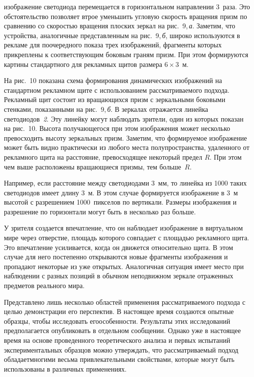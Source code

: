 \begin{multicols}{2}
\bigskip
\addtocounter{figure}{1}  

\noindent
изображение светодиода перемещается в горизонтальном направлении 3~раза. Это 
обстоятельство позволяет втрое уменьшить угловую скорость вращения призм по 
сравнению со скоростью вращения плоских зеркал на рис.~9,\,\textit{а}. Заметим, 
что устройства, аналогичные представленным на рис.~9,\,\textit{б}, широко 
используются в рекламе для поочередного показа трех изображений, фрагменты которых 
прикреплены к соответствующим боковым граням призм. При этом формируются 
картины стандартного для рекламных щитов размера $6\times 3$~м. 

  
  На рис.~10 показана схема формирования динамических изображений на 
стандартном рекламном щите с использованием рассматриваемого подхода. Рекламный 
щит состоит из вращающихся призм с зеркальными боковыми стенками, показанными на 
рис.~9,\,\textit{б}. В зеркалах отражается линейка светодиодов~\textit{2}. Эту 
линейку могут наблюдать зрители, один из которых показан на рис.~10. Высота 
получающегося при этом изображения может несколько превосходить высоту зеркальных 
призм. Заметим, что формируемое изображение может быть видно практически из любого 
места полупространства, удаленного от рекламного щита на расстояние, превосходящее 
некоторый предел $R$. При этом чем выше расположены вращающиеся призмы, тем 
больше~$R$. 
  

  
  Например, если расстояние между светодиодами 3~мм, то линейка из 1000 таких 
светодиодов имеет длину 3~м. В этом случае формируется изображение в 3~м высотой с 
разрешением 1000~пикселов по вертикали. Размеры изображения и разрешение по 
горизонтали могут быть в несколько раз больше. 
  
  У зрителя создается впечатление, что он наблюдает изображение в виртуальном мире 
через отверстие, площадь которого совпадает с площадью рекламного щита. Это 
впечатление усиливается, когда он движется относительно щита. В этом случае для него 
постепенно открываются новые фрагменты изображения и пропадают некоторые из уже 
открытых. Аналогичная ситуация имеет место при наблюдении с разных позиций в 
обычном неподвижном зеркале отраженных предметов реального мира. 
  
  Представлено лишь несколько областей применения рассматриваемого подхода с 
целью демонстрации его перспектив. В настоящее время создаются опытные образцы, 
чтобы исследовать его\linebreak особенности. Результаты этих исследований предполагается 
опубликовать в отдельном сообщении. Однако уже в настоящее время на основе 
проведенного теоретического анализа и первых испытаний экспериментальных образцов 
можно утверждать, что рассматриваемый подход обладает\linebreak многими весьма 
привлекательными свойствами, которые могут быть использованы в различных 
применениях. 



\end{multicols}
